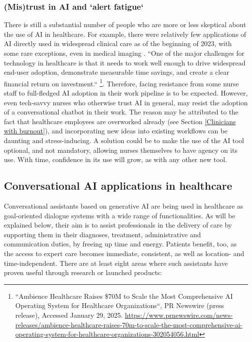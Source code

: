 \subsubsection{(Mis)trust in AI and `alert fatigue`}\label{Mistrust}
There is still a substantial number of people who are more or less skeptical about the use of AI in healthcare. For example, there were relatively few applications of AI directly used in widespread clinical care as of the beginning of 2023, with some rare exceptions, even in medical imaging \cite{chaGPTpassesUSMLE2023}. ``One of the major challenges for technology in healthcare is that it needs to work well enough to drive widespread end-user adoption, demonstrate measurable time savings, and create a clear financial return on investment.`` \footnote{``Ambience Healthcare Raises \$70M to Scale the Most Comprehensive AI Operating System for Healthcare Organizations``, PR Newswire (press release), Accessed January 29, 2025. \url{https://www.prnewswire.com/news-releases/ambience-healthcare-raises-70m-to-scale-the-most-comprehensive-ai-operating-system-for-healthcare-organizations-302054056.html}}. Therefore, facing resistance from some nurse staff to full-fledged AI adoption in their work pipeline is to be expected. However, even tech-savvy nurses who otherwise trust AI in general, may resist the adoption of a conversational chatbot in their work. The reason may be attributed to the fact that healthcare employees are overworked already (see Section \ref{Clinicians with burnout}), and incorporating new ideas into existing workflows can be daunting and stress-inducing. A solution could be to make the use of the AI tool optional, and not mandatory, allowing nurses themselves to have agency on its use. With time, confidence in its use will grow, as with any other new tool. 

\subsection{Conversational AI applications in healthcare}
Conversational assistants based on generative AI are being used in healthcare as goal-oriented dialogue systems with a wide range of functionalities. As will be explained below, their aim is to assist professionals in the delivery of care by supporting them in their diagnoses, treatment, administrative and communication duties, by freeing up time and energy. Patients benefit, too, as the access to expert care becomes immediate, consistent, as well as location- and time-independent. There are at least eight areas where such assistants have proven useful through research or launched products:

